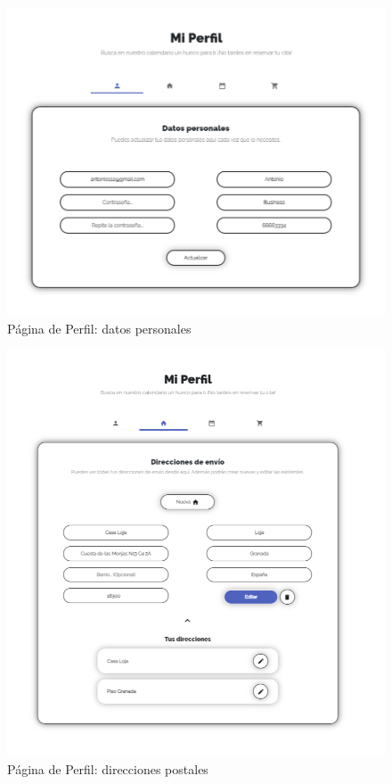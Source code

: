 \begin{figure}[H]
  \centering
  \includegraphics[scale=0.4]{images/front-end-profile-1.png}
  \caption{Página de Perfil: datos personales}
  \label{}
\end{figure}

\begin{figure}[H]
  \centering
  \includegraphics[scale=0.4]{images/front-end-profile-2.png}
  \caption{Página de Perfil: direcciones postales}
  \label{}
\end{figure}

